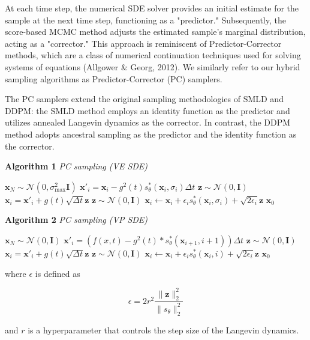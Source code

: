 At each time step, the numerical SDE solver provides an initial estimate for the sample at the next time step, functioning as a "predictor." Subsequently, the score-based MCMC method adjusts the estimated sample's marginal distribution, acting as a "corrector." This approach is reminiscent of Predictor-Corrector methods, which are a class of numerical continuation techniques used for solving systems of equations (Allgower \& Georg, 2012). We similarly refer to our hybrid sampling algorithms as Predictor-Corrector (PC) samplers.

The PC samplers extend the original sampling methodologies of SMLD and DDPM: the SMLD method employs an identity function as the predictor and utilizes annealed Langevin dynamics as the corrector. In contrast, the DDPM method adopts ancestral sampling as the predictor and the identity function as the corrector.

\noindent\textbf{Algorithm 1} \textit{PC sampling (VE SDE)}
\begin{algorithmic}[1]
    \STATE $\mathbf{x}_N \sim \mathcal{N}(0, \sigma_{\max}^2 \mathbf{I})$
        \STATE $\mathbf{x}'_i = \mathbf{x}_i -g^2(t)s_\theta^* \left( \mathbf{x}_i, \sigma_i \right) {\Delta t}$
        \STATE $\mathbf{z} \sim \mathcal{N}(0, \mathbf{I})$
        \STATE $\mathbf{x}_i = \mathbf{x}'_i +g(t) \sqrt{\Delta t} \mathbf{z}$
            \STATE $\mathbf{z} \sim \mathcal{N}(0, \mathbf{I})$
            \STATE $\mathbf{x}_i \leftarrow \mathbf{x}_i + \epsilon_i s_\theta^* \left( \mathbf{x}_i, \sigma_i \right) + \sqrt{2 \epsilon_i} \mathbf{z}$
        \ENDFOR
    \ENDFOR
    \RETURN $\mathbf{x}_0$
\end{algorithmic}

\bigskip

\noindent\textbf{Algorithm 2} \textit{PC sampling (VP SDE)}
\begin{algorithmic}[1]
    \STATE $\mathbf{x}_N \sim \mathcal{N}(0, \mathbf{I})$
        \STATE $\mathbf{x}'_i = (f(x,t)-g^2(t)*s_\theta^* \left( \mathbf{x}_{i+1}, i+1 \right)) {\Delta t}$
        \STATE $\mathbf{z} \sim \mathcal{N}(0, \mathbf{I})$
        \STATE $\mathbf{x}_i = \mathbf{x}'_i +g(t) \sqrt{\Delta t} \mathbf{z}$
            \STATE $\mathbf{z} \sim \mathcal{N}(0, \mathbf{I})$
            \STATE $\mathbf{x}_i \leftarrow \mathbf{x}_i + \epsilon_i s_\theta^* \left( \mathbf{x}_i, i \right) + \sqrt{2 \epsilon_i} \mathbf{z}$
        \ENDFOR
    \ENDFOR
    \RETURN $\mathbf{x}_0$
\end{algorithmic}

where $\epsilon$ is defined as 

\begin{equation}
    \epsilon = 2 r^2 \frac{\|\mathbf{z}\|_2^2}{\|s_\theta\|_2^2}
\end{equation}

and $r$ is a hyperparameter that controls the step size of the Langevin dynamics.







